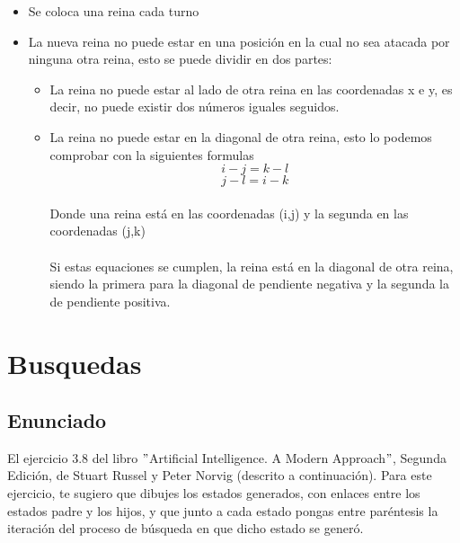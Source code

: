 \documentclass[a4paper,10pt]{article}
\begin{document}
\begin{itemize}
  \item Se coloca una reina cada turno
  \item La nueva reina no puede estar en una posición en la cual no sea atacada por ninguna otra reina, esto se puede dividir en dos partes:\\
  \begin{itemize}
    \item La reina no puede estar al lado de otra reina en las coordenadas x e y, es decir, no puede existir dos números iguales seguidos.
    \item La reina no puede estar en la diagonal de otra reina, esto  lo podemos comprobar con la siguientes formulas
    \begin{equation}
      i-j=k-l
    \end{equation}
    \begin{equation}
      j-l=i-k
    \end{equation}
    \paragraph{}
    Donde una reina está en las coordenadas (i,j) y la segunda en las coordenadas (j,k)
    \paragraph{}
    Si estas equaciones se cumplen, la reina está en la diagonal de otra reina, siendo la primera para la diagonal de pendiente negativa y la segunda la de pendiente positiva.
  \end{itemize}
\end{itemize}


\pagebreak



\section{Busquedas}
\subsection{Enunciado}
El ejercicio 3.8 del libro $"$Artificial Intelligence. A Modern Approach$"$, Segunda Edición, de Stuart Russel y Peter Norvig (descrito a continuación). Para este ejercicio, te sugiero que dibujes los estados generados, con enlaces entre los estados padre y los hijos, y que junto a cada estado pongas entre paréntesis la iteración del proceso de búsqueda en que dicho estado se generó.
\end{document}
